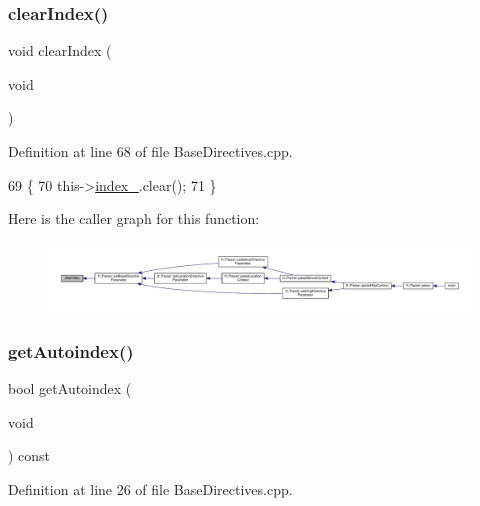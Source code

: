 \subsubsection{\texorpdfstring{clear\+Index()}{clearIndex()}}
{\footnotesize\ttfamily void clear\+Index (\begin{DoxyParamCaption}\item[{void}]{ }\end{DoxyParamCaption})\hspace{0.3cm}{\ttfamily [inherited]}}



Definition at line 68 of file Base\+Directives.\+cpp.


\begin{DoxyCode}
69     \{
70         this->\hyperlink{classft_1_1_base_directives_a6ba30626837f300201cd32c35d50aa49}{index\_}.clear();
71     \}
\end{DoxyCode}
Here is the caller graph for this function\+:
\nopagebreak
\begin{figure}[H]
\begin{center}
\leavevmode
\includegraphics[width=350pt]{classft_1_1_base_directives_a36d96dc74e650162c25a325813130ab2_icgraph}
\end{center}
\end{figure}
\mbox{\label{classft_1_1_base_directives_a4c11ed7ad76aeac228b029a2444de568}} 
\subsubsection{\texorpdfstring{get\+Autoindex()}{getAutoindex()}}
{\footnotesize\ttfamily bool get\+Autoindex (\begin{DoxyParamCaption}\item[{void}]{ }\end{DoxyParamCaption}) const\hspace{0.3cm}{\ttfamily [inherited]}}



Definition at line 26 of file Base\+Directives.\+cpp.


